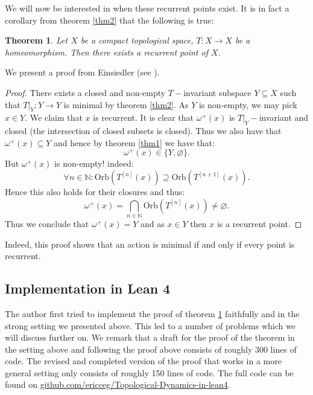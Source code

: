\documentclass[11pt]{article}
\newtheorem{theorem}{Theorem}[section]
\theoremstyle{definition}              %
\theoremstyle{definition}              %
\theoremstyle{definition}              %
\begin{document}
We will now be interested in when these recurrent points exist. It is in fact a corollary from theorem \ref{thm2} that the following is true:

\begin{theorem}\label{thm3}
    Let $X$ be a compact topological space, $T:X \to X$ be a homeomorphism. Then there exists a recurrent point of $X$.
\end{theorem}

We present a proof from Einsiedler (see \cite{einsiedler2010ergodic}).

\begin{proof}
    There exists a closed and non-empty $T-$invariant subspace $Y \subseteq X$ such that $T|_Y:Y \to Y$ is minimal by theorem \ref{thm2}. As $Y$ is non-empty, we may pick $x \in Y$. We claim that $x$ is recurrent. It is clear that $\omega^+(x)$ is $T|_Y-$invariant and closed (the intersection of closed subsets is closed). Thus we also have that $\omega^+(x) \subseteq Y$ and hence by theorem \ref{thm1} we have that:
    \begin{equation}
        \omega^+(x) \in \{Y,\varnothing\}.
    \end{equation}
    But $\omega^+(x)$ is non-empty! indeed:
    \begin{equation}
        \forall n \in \mathbb{N}: \text{Orb}(T^{[n]}(x)) \supseteq \text{Orb}(T^{[n+1]}(x)).
    \end{equation}
    Hence this also holds for their closures and thus:
    \begin{equation}
        \omega^+(x)=\bigcap_{n \in \mathbb{N}}\text{Orb}(T^{[n]}(x)) \neq \varnothing.
    \end{equation}
    Thus we conclude that $\omega^+(x)=Y$ and as $x \in Y$ then $x$ is a recurrent point.
\end{proof}

Indeed, this proof shows that an action is minimal if and only if every point is recurrent.

\subsection{Implementation in Lean 4}
The author first tried to implement the proof of theorem \ref{thm3} faithfully and in the strong setting we presented above. This led to a number of problems which we will discuss further on. We remark that a draft for the proof of the theorem in the setting above and following the proof above consists of roughly 300 lines of code. The revised and completed version of the proof that works in a more general setting only consists of roughly 150 lines of code. The full code can be found on \href{https://github.com/ericceg/Topological-Dynamics-in-lean4/blob/master/Project/Corollary.lean}{github.com/ericceg/Topological-Dynamics-in-lean4}.
\end{document}
